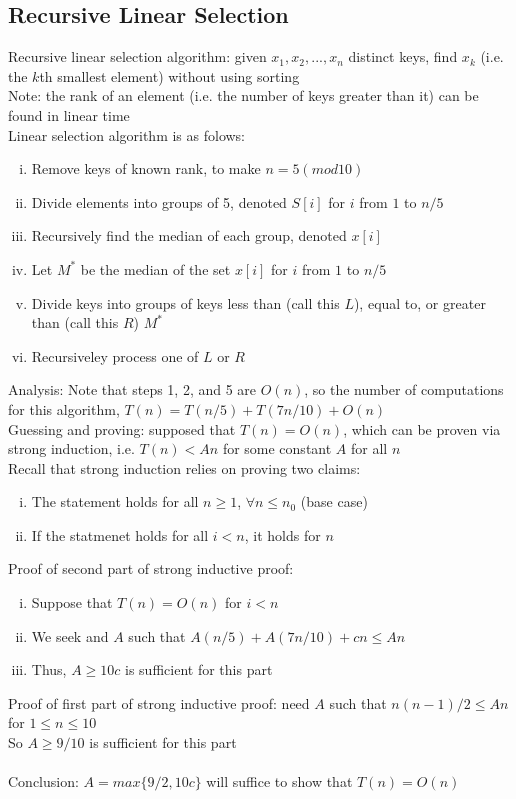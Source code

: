 \documentclass{article}
\begin{document}
		\subsection{Recursive Linear Selection}
			Recursive linear selection algorithm: given $x_1, x_2, ..., x_n$ distinct keys, find $x_k$ (i.e. the $k$th smallest element) without using sorting \\
			Note: the rank of an element (i.e. the number of keys greater than it) can be found in linear time \\
			Linear selection algorithm is as folows:
			\begin{enumerate}[(i)]
				\item Remove keys of known rank, to make $n = 5 (mod 10)$
				\item Divide elements into groups of 5, denoted $S[i]$ for $i$ from $1$ to $n/5$
				\item Recursively find the median of each group, denoted $x[i]$
				\item Let $M^*$ be the median of the set $x[i]$ for $i$ from $1$ to $n/5$
				\item Divide keys into groups of keys less than (call this $L$), equal to, or greater than (call this $R$) $M^*$
				\item Recursiveley process one of $L$ or $R$
				\end{enumerate}
			Analysis: Note that steps 1, 2, and 5 are $O(n)$, so the number of computations for this algorithm, $T(n) = T(n/5) + T(7n/10) + O(n)$ \\
			Guessing and proving: supposed that $T(n) = O(n)$, which can be proven via strong induction, i.e. $T(n) < An$ for some constant $A$ for all $n$ \\
			Recall that strong induction relies on proving two claims:
			\begin{enumerate}[(i)]
				\item The statement holds for all $n \geq 1$, $\forall n \leq n_0$ (base case)
				\item If the statmenet holds for all $i < n$, it holds for $n$
				\end{enumerate}
			Proof of second part of strong inductive proof:
			\begin{enumerate}[(i)]
				\item Suppose that $T(n) = O(n)$ for $i < n$
				\item We seek and $A$ such that $A(n/5) + A(7n/10) + cn \leq An$
				\item Thus, $A \geq 10c$ is sufficient for this part
				\end{enumerate}
			Proof of first part of strong inductive proof: need $A$ such that $n(n - 1)/2 \leq An$ for $1 \leq n \leq 10$ \\
			So $A \geq 9/10$ is sufficient for this part \\
			\\
			Conclusion: $A = max\{9/2, 10c\}$ will suffice to show that $T(n) = O(n)$ 
\end{document}
